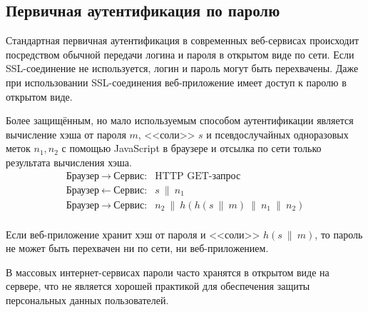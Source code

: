\subsection{Первичная аутентификация по паролю}

Стандартная первичная аутентификация в современных веб-сервисах происходит посредством обычной передачи логина и пароля в открытом виде по сети. Если SSL-соединение не используется, логин и пароль могут быть перехвачены. Даже при использовании SSL-соединения веб-приложение имеет доступ к паролю в открытом виде.

Более защищённым, но мало используемым способом аутентификации является вычисление хэша от пароля $m$, <<соли>> $s$ и псевдослучайных одноразовых меток $n_1, n_2$ с помощью JavaScript в браузере и отсылка по сети только результата вычисления хэша.
\[ \begin{array}{ll}
    \text{Браузер} ~\rightarrow~ \text{Сервис:} & \text{HTTP GET-запрос} \\
    \text{Браузер} ~\leftarrow~ \text{Сервис:}  & s ~\|~ n_1 \\
    \text{Браузер} ~\rightarrow~ \text{Сервис:} & n_2 ~\|~ h( h(s ~\|~ m) ~\|~ n_1 ~\|~ n_2) \\
\end{array} \]

Если веб-приложение хранит хэш от пароля и <<соли>> $h(s ~\|~ m)$, то пароль не может быть перехвачен ни по сети, ни веб-приложением.

В массовых интернет-сервисах пароли часто хранятся в открытом виде на сервере, что не является хорошей практикой для обеспечения защиты персональных данных пользователей.




